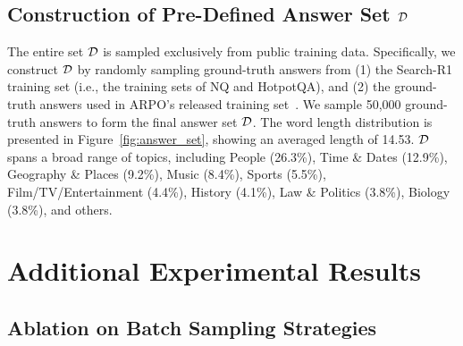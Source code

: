 \documentclass[10pt, a4paper, logo]{googledeepmind} %
\begin{document}
\subsection{Construction of Pre-Defined Answer Set ${\mathcal{D}}$}
\label{sec:construction_answer_set}

The entire set ${\mathcal{D}}$ is sampled exclusively from public training data. Specifically, we construct ${\mathcal{D}}$ by randomly sampling ground-truth answers from (1) the Search-R1 training set (i.e., the training sets of NQ and HotpotQA), and (2) the ground-truth answers used in ARPO's released training set~\citep{dong2025agentic}. We sample 50,000 ground-truth answers to form the final answer set ${\mathcal{D}}$. The word length distribution is presented in Figure~\ref{fig:answer_set}, showing an averaged length of 14.53. ${\mathcal{D}}$ spans a broad range of topics, including People (26.3\%), Time \& Dates (12.9\%), Geography \& Places (9.2\%), Music (8.4\%), Sports (5.5\%), Film/TV/Entertainment (4.4\%), History (4.1\%), Law \& Politics (3.8\%), Biology (3.8\%), and others.

\section{Additional Experimental Results}

\subsection{Ablation on Batch Sampling Strategies}
\label{sec:ablation_batch_completion}
\end{document}
